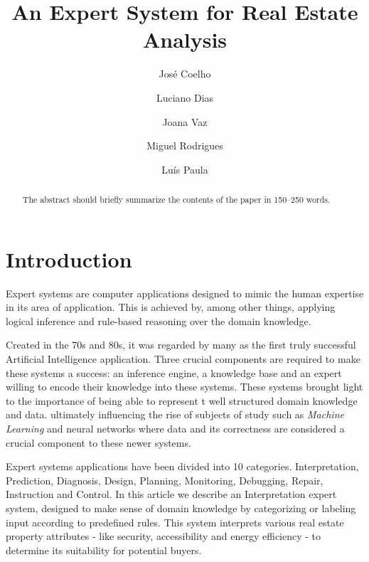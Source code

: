 \documentclass[runningheads]{llncs}
\begin{document}
%
\title{An Expert System for Real Estate Analysis}
%
%
\author{José Coelho \and Luciano Dias
\and Joana Vaz \and Miguel Rodrigues  \and Luís Paula }

%
\maketitle              %
%
\begin{abstract}
The abstract should briefly summarize the contents of the paper in
150--250 words.

\end{abstract}
%
%
%
\section{Introduction}

Expert systems are computer applications designed to mimic the human expertise in its area of application. This is achieved by, among other things, applying logical inference and rule-based reasoning over the domain knowledge.

Created in the 70s and 80s, it was regarded by many as the first truly successful Artificial Intelligence application. Three crucial components are required to make these systems a success: an inference engine, a knowledge base and an expert willing to encode their knowledge into these systems.
These systems brought light to the importance of being able to represent t well structured domain knowledge and data. ultimately influencing the rise of subjects of study such as \textit{Machine Learning} and neural networks where data and its correctness are considered a crucial component to these newer systems.

Expert systems applications have been divided into 10 categories\cite{hayesroth}. Interpretation, Prediction, Diagnosis, Design, Planning, Monitoring, Debugging, Repair, Instruction and Control. In this article we describe an Interpretation expert system, designed to make sense of domain knowledge by categorizing or labeling input according to predefined rules. This system interprets various real estate property attributes - like security, accessibility and energy efficiency - to determine its suitability for potential buyers.
\end{document}
